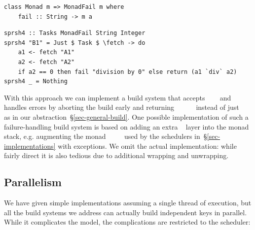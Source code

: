 \vspace{1mm}
\begin{verbatim}
class Monad m => MonadFail m where
    fail :: String -> m a
\end{verbatim}
\begin{verbatim}
sprsh4 :: Tasks MonadFail String Integer
sprsh4 "B1" = Just $ Task $ \fetch -> do
    a1 <- fetch "A1"
    a2 <- fetch "A2"
    if a2 == 0 then fail "division by 0" else return (a1 `div` a2)
sprsh4 _ = Nothing
\end{verbatim}
\vspace{1mm}

\noindent
With this approach we can implement a build system that accepts
~~~ and handles errors by aborting the
build early and returning
~~~~~ instead of just
~~~ as in our 
abstraction~\S\ref{sec-general-build}. One possible implementation of such a
failure-handling build system is based on adding an extra
~ layer into the monad stack, e.g. augmenting the monad
~~~~ used by the schedulers
in~\S\ref{sec-implementations} with exceptions. We omit the actual
implementation: while fairly direct it is also tedious due to additional
wrapping and unwrapping.


\subsection{Parallelism}\label{sec-parallelism}

We have given simple implementations assuming a single thread of execution,
but all the build systems we address can actually build independent keys in
parallel. While it complicates the model, the complications are restricted
to the scheduler:


